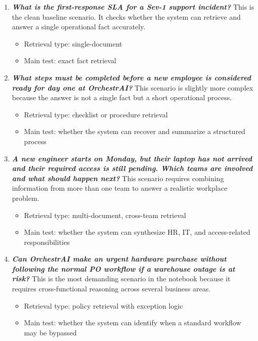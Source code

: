\begin{enumerate}
    \item \textbf{\textit{What is the first-response SLA for a Sev-1 support incident?}} This is the clean baseline scenario. It checks whether the system can retrieve and answer a single operational fact accurately.
        \begin{itemize}
            \item Retrieval type: single-document
            \item Main test: exact fact retrieval
        \end{itemize}
    \item \textbf{\textit{What steps must be completed before a new employee is considered ready for day one at OrchestrAI?}} This scenario is slightly more complex because the answer is not a single fact but a short operational process.
        \begin{itemize}
            \item Retrieval type: checklist or procedure retrieval
            \item Main test: whether the system can recover and summarize a structured process
        \end{itemize}
     \item \textbf{\textit{A new engineer starts on Monday, but their laptop has not arrived and their required access is still pending. Which teams are involved and what should happen next?}} This scenario requires combining information from more than one team to answer a realistic workplace problem.
        \begin{itemize}
            \item Retrieval type: multi-document, cross-team retrieval
            \item Main test: whether the system can synthesize HR, IT, and access-related responsibilities
        \end{itemize}
     \item \textbf{\textit{Can OrchestrAI make an urgent hardware purchase without following the normal PO workflow if a warehouse outage is at risk?}} This is the most demanding scenario in the notebook because it requires cross-functional reasoning across several business areas.
        \begin{itemize}
            \item Retrieval type: policy retrieval with exception logic
            \item Main test: whether the system can identify when a standard workflow may be bypassed

\end{itemize}
\end{enumerate}
